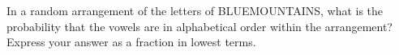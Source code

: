 In a random arrangement of the letters of BLUEMOUNTAINS, what is the probability that the vowels are in alphabetical order within the arrangement? Express your answer as a fraction in lowest terms.
